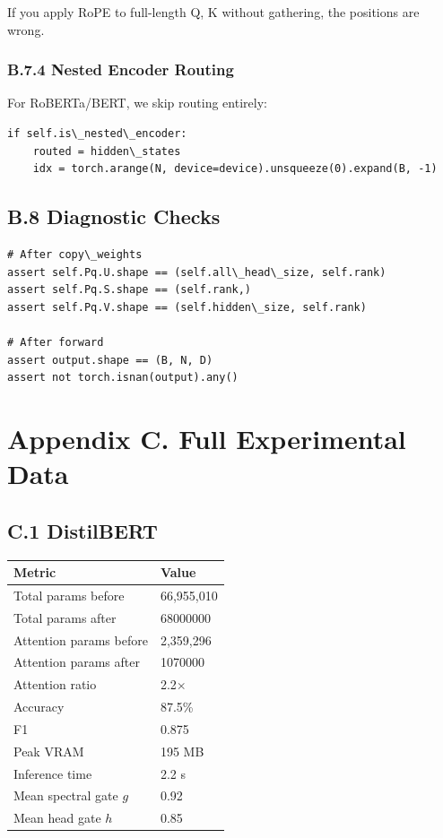 If you apply RoPE to full-length Q, K without gathering, the positions 
are wrong.

\subsubsection{B.7.4 Nested Encoder Routing}

For RoBERTa/BERT, we skip routing entirely:

\begin{lstlisting}
if self.is\_nested\_encoder:
    routed = hidden\_states
    idx = torch.arange(N, device=device).unsqueeze(0).expand(B, -1)
\end{lstlisting}

\subsection{B.8 Diagnostic Checks}

\begin{lstlisting}
# After copy\_weights
assert self.Pq.U.shape == (self.all\_head\_size, self.rank)
assert self.Pq.S.shape == (self.rank,)
assert self.Pq.V.shape == (self.hidden\_size, self.rank)

# After forward
assert output.shape == (B, N, D)
assert not torch.isnan(output).any()
\end{lstlisting}



\section{Appendix C. Full Experimental Data}

\subsection{C.1 DistilBERT}

\begin{table}[H]
\centering
\small
\begin{tabular}{ll}
\toprule
\textbf{Metric} & \textbf{Value} \\
\midrule
Total params before & 66,955,010 \\
Total params after & 68000000 \\
Attention params before & 2,359,296 \\
Attention params after & 1070000 \\
Attention ratio & 2.2$\times$ \\
Accuracy & 87.5\% \\
F1 & 0.875 \\
Peak VRAM & 195 MB \\
Inference time & 2.2 s \\
Mean spectral gate $g$ & 0.92 \\
Mean head gate $h$ & 0.85 \\
\bottomrule
\end{tabular}
\end{table}

